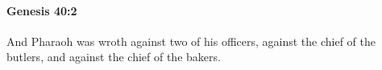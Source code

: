 
		\paragraph{Genesis 40:2} %
			\label{GENESIS-40-2}

			And Pharaoh was wroth against two of his officers, against the chief of the butlers, and against the chief of the bakers.


